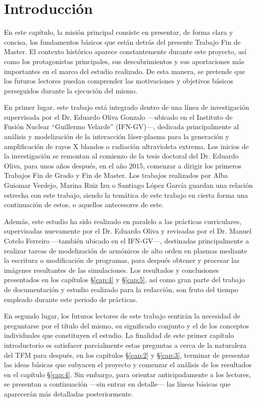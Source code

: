 \chapter{Introducción}\label{cap:1}
En este capítulo, la misión principal consiste en presentar, de forma clara y concisa, los fundamentos básicos que están detrás del presente Trabajo Fin de Master. El contexto histórico aparece constantemente durante este proyecto, así como los protagonistas principales, sus descubrimientos y sus aportaciones más importantes en el marco del estudio realizado. De esta manera, se pretende que los futuros lectores puedan comprender las motivaciones y objetivos básicos perseguidos durante la ejecución del mismo.

En primer lugar, este trabajo está integrado dentro de una línea de investigación supervisada por el Dr. Eduardo Oliva Gonzalo ---ubicado en el Instituto de Fusión Nuclear \enquote{Guillermo Velarde} (IFN-GV)---, dedicada principalmente al análisis y modelización de la interacción láser-plasma para la generación y amplificación de rayos X blandos o radiación ultravioleta extrema. Los inicios de la investigación se remontan al comienzo de la tesis doctoral del Dr. Eduardo Oliva\autocite{olivaMejoraCodigoHidrodinamico2010}, para unos años después, en el año $2015$, comenzar a dirigir los primeros Trabajos Fin de Grado y Fin de Master. Los trabajos realizados por Alba Guiomar Verdejo, Marina Ruiz Izu o Santiago López García guardan una relación estrecha con este trabajo, siendo la temática de este trabajo en cierta forma una continuación de estos, o aquellos antecesores de este.

Además, este estudio ha sido realizado en paralelo a las prácticas curriculares, supervisadas nuevamente por el Dr. Eduardo Oliva y revisadas por el Dr. Manuel Cotelo Ferreiro ---también ubicado en el IFN-GV---, destinadas principalmente a realizar tareas de modelización de armónicos de alto orden en plasmas mediante la escritura o modificación de programas, para después obtener y procesar las imágenes resultantes de las simulaciones. Los resultados y conclusiones presentados en los capítulos \S\ref{cap:4} y \S\ref{cap:5}, así como gran parte del trabajo de documentación y estudio realizado para la redacción, son fruto del tiempo empleado durante este periodo de prácticas.

En segundo lugar, los futuros lectores de este trabajo sentirán la necesidad de preguntarse por el título del mismo, su significado conjunto y el de los conceptos individuales que constituyen el estudio. La finalidad de este primer capítulo introductorio es satisfacer parcialmente estas preguntas a cerca de la naturaleza del TFM para después, en los capítulos \S\ref{cap:2} y \S\ref{cap:3}, terminar de presentar las ideas básicas que subyacen el proyecto y comenzar el análisis de los resultados en el capítulo \S\ref{cap:4}. Sin embargo, para orientar anticipadamente a los lectores, se presentan a continuación ---sin entrar en detalle--- las líneas básicas que aparecerán más detalladas posteriormente.

